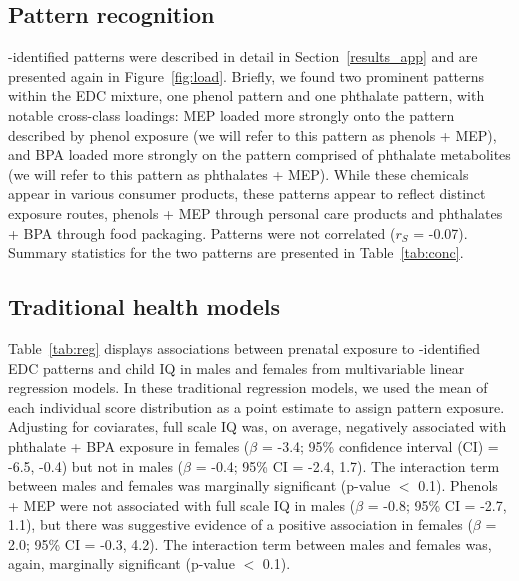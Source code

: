 \subsection{Pattern recognition}
\bnmfc-identified patterns were described in detail in Section~\ref{results_app} and are presented again in Figure~\ref{fig:load}. Briefly, we found two prominent patterns within the EDC mixture, one phenol pattern and one phthalate pattern, with notable cross-class loadings: MEP loaded more strongly onto the pattern described by phenol exposure (we will refer to this pattern as phenols + MEP), and BPA loaded more strongly on the pattern comprised of phthalate metabolites (we will refer to this pattern as phthalates + MEP). While these chemicals appear in various consumer products, these patterns appear to reflect distinct exposure routes, phenols + MEP through personal care products and phthalates + BPA through food packaging. Patterns were not correlated ($r_S$ = -0.07). Summary statistics for the two patterns are presented in Table~\ref{tab:conc}.

\subsection{Traditional health models}
Table~\ref{tab:reg} displays associations between prenatal exposure to \bnmfc-identified EDC patterns and child IQ in males and females from multivariable linear regression models. In these traditional regression models, we used the mean of each individual score distribution as a point estimate to assign pattern exposure. Adjusting for coviarates, full scale IQ was, on average, negatively associated with phthalate + BPA exposure in females ($\beta$ = -3.4; 95\% confidence interval (CI) = -6.5, -0.4) but not in males ($\beta$ = -0.4; 95\% CI = -2.4, 1.7). The interaction term between males and females was marginally significant (p-value $<$ 0.1). Phenols + MEP were not associated with full scale IQ in males ($\beta$ = -0.8; 95\% CI =  -2.7, 1.1), but there was suggestive evidence of a positive association in females ($\beta$ = 2.0; 95\% CI = -0.3, 4.2). The interaction term between males and females was, again, marginally significant (p-value $<$ 0.1).

